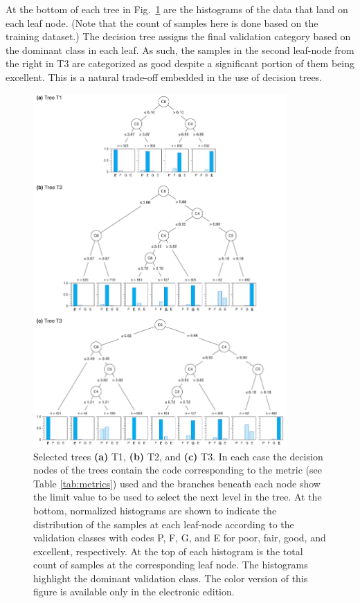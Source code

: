 At the bottom of each tree in Fig.~\ref{fig:trees} are the histograms of the data that land on each leaf node. (Note that the count of samples here is done based on the training dataset.) The decision tree assigns the final validation category based on the dominant class in each leaf. As such, the samples in the second leaf-node from the right in T3 are categorized as good despite a significant portion of them being excellent. This is a natural trade-off embedded in the use of decision trees.


\begin{figure}
	\centering
	\includegraphics[width=0.86\textwidth]{figures/pdf/figure-09}
	\caption{Selected trees \textbf{(a)} T1, \textbf{(b)} T2, and \textbf{(c)} T3. In each case the decision nodes of the trees contain the code corresponding to the metric (see Table \ref{tab:metrics}) used and the branches beneath each node show the limit value to be used to select the next level in the tree. At the bottom, normalized histograms are shown to indicate the distribution of the samples at each leaf-node according to the validation classes with codes P, F, G, and E for poor, fair, good, and excellent, respectively. At the top of each histogram is the total count of samples at the corresponding leaf node. The histograms highlight the dominant validation class. The color version of this figure is available only in the electronic edition.}
	\label{fig:trees}
\end{figure}

